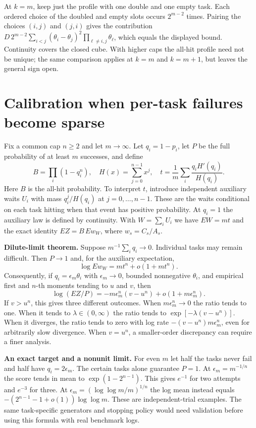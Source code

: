 \documentclass[11pt]{article}
\begin{document}
At $k=m$, keep just the profile with one double and one empty task. Each ordered choice of the doubled and empty slots occurs $2^{m-2}$ times. Pairing the choices $(i,j)$ and $(j,i)$ gives the contribution $D\,2^{m-2}\sum_{i<j}(\theta_i-\theta_j)^2\prod_{\ell\ne i,j}\theta_\ell$, which equals the displayed bound. Continuity covers the closed cube. With higher caps the all-hit profile need not be unique; the same comparison applies at $k=m$ and $k=m+1$, but leaves the general sign open.

\newpage
\section*{Calibration when per-task failures become sparse}
Fix a common cap $n\ge2$ and let $m\to\infty$. Let $q_i=1-p_i$, let $P$ be the full probability of at least $m$ successes, and define
\[
 B=\prod_i(1-q_i^n),\quad H(x)=\sum_{j=0}^{n-1}x^j,\quad
 t=\frac1m\sum_i \frac{q_i H'(q_i)}{H(q_i)}.
\]
Here $B$ is the all-hit probability. To interpret $t$, introduce independent auxiliary waits $U_i$ with mass $q_i^j/H(q_i)$ at $j=0,\ldots,n-1$. These are the waits conditional on each task hitting when that event has positive probability. At $q_i=1$ the auxiliary law is defined by continuity. With $W=\sum_i U_i$ we have $EW=mt$ and the exact identity $EZ=B\,E w_W$, where $w_s=C_s/A_s$.

\textbf{Dilute-limit theorem.} Suppose $m^{-1}\sum_i q_i\to0$. Individual tasks may remain difficult. Then $P\to1$ and, for the auxiliary expectation,
\[
 \log E w_W = mt^n+o(1+mt^n).
\]
Consequently, if $q_i=\epsilon_m\theta_i$ with $\epsilon_m\to0$, bounded nonnegative $\theta_i$, and empirical first and $n$-th moments tending to $u$ and $v$, then
\[
 \log(EZ/P)=-m\epsilon_m^n(v-u^n)+o(1+m\epsilon_m^n).
\]
If $v>u^n$, this gives three different outcomes. When $m\epsilon_m^n\to0$ the ratio tends to one. When it tends to $\lambda\in(0,\infty)$ the ratio tends to $\exp[-\lambda(v-u^n)]$. When it diverges, the ratio tends to zero with log rate $-(v-u^n)m\epsilon_m^n$, even for arbitrarily slow divergence. When $v=u^n$, a smaller-order discrepancy can require a finer analysis.

\textbf{An exact target and a nonunit limit.} For even $m$ let half the tasks never fail and half have $q_i=2\epsilon_m$. The certain tasks alone guarantee $P=1$. At $\epsilon_m=m^{-1/n}$ the score tends in mean to $\exp(1-2^{n-1})$. This gives $e^{-1}$ for two attempts and $e^{-3}$ for three. At $\epsilon_m=(\log\log m/m)^{1/n}$ the log mean instead equals $-(2^{n-1}-1+o(1))\log\log m$. These are independent-trial examples. The same task-specific generators and stopping policy would need validation before using this formula with real benchmark logs.
\end{document}
